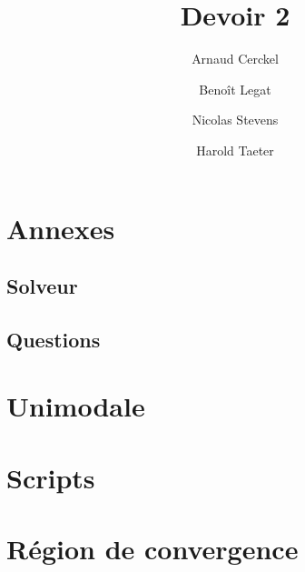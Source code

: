 \documentclass{article}
\title{Devoir 2}
\author{Arnaud Cerckel \and Benoît Legat \and
Nicolas Stevens \and Harold Taeter}
\begin{document}
\maketitle





\appendix
\section{Annexes}

\subsection{Solveur}




\subsection{Questions}








\section{Unimodale}




\section{Scripts}






\section{Région de convergence}


\end{document}
